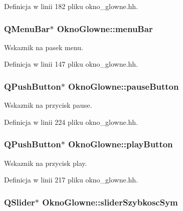 Definicja w linii 182 pliku okno\+\_\+glowne.\+hh.

\hypertarget{class_okno_glowne_a5a87098d9d4bd868670f5a5e72023a0a}{}
\subsubsection[{menu\+Bar}]{\setlength{\rightskip}{0pt plus 5cm}Q\+Menu\+Bar$\ast$ Okno\+Glowne\+::menu\+Bar}\label{class_okno_glowne_a5a87098d9d4bd868670f5a5e72023a0a}
Wskaznik na pasek menu. 

Definicja w linii 147 pliku okno\+\_\+glowne.\+hh.

\hypertarget{class_okno_glowne_a0dde8df8a49b8f47f17f8e748fd15967}{}
\subsubsection[{pause\+Button}]{\setlength{\rightskip}{0pt plus 5cm}Q\+Push\+Button$\ast$ Okno\+Glowne\+::pause\+Button}\label{class_okno_glowne_a0dde8df8a49b8f47f17f8e748fd15967}
Wskaznik na przycisk pause. 

Definicja w linii 224 pliku okno\+\_\+glowne.\+hh.

\hypertarget{class_okno_glowne_a50f936486c1bc3b3278823a8eb90841e}{}
\subsubsection[{play\+Button}]{\setlength{\rightskip}{0pt plus 5cm}Q\+Push\+Button$\ast$ Okno\+Glowne\+::play\+Button}\label{class_okno_glowne_a50f936486c1bc3b3278823a8eb90841e}
Wskaznik na przycisk play. 

Definicja w linii 217 pliku okno\+\_\+glowne.\+hh.

\hypertarget{class_okno_glowne_a85328893065393400d5a0344004ca78b}{}
\subsubsection[{slider\+Szybkosc\+Sym}]{\setlength{\rightskip}{0pt plus 5cm}Q\+Slider$\ast$ Okno\+Glowne\+::slider\+Szybkosc\+Sym}\label{class_okno_glowne_a85328893065393400d5a0344004ca78b}


